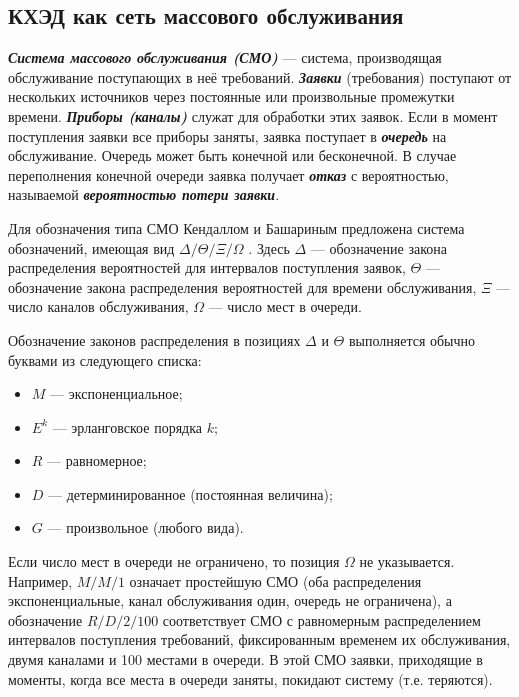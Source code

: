 \subsection{КХЭД как сеть массового обслуживания} \label{net}

\textbf{\textit{Система массового обслуживания (СМО)}} --- система, производящая обслуживание поступающих в неё требований. \textbf{\textit{Заявки}} (требования) поступают от нескольких источников через постоянные или произвольные промежутки времени. \textbf{\textit{Приборы (каналы)}} служат для обработки этих заявок. Если в момент поступления заявки все приборы заняты, заявка поступает в \textbf{\textit{очередь}} на обслуживание. Очередь может быть конечной или бесконечной. В случае переполнения конечной очереди заявка получает \textbf{\textit{отказ}} с вероятностью, называемой \textbf{\textit{вероятностью потери заявки}}.

\vspace{\baselineskip}
Для обозначения типа СМО Кендаллом и Башариным предложена система обозначений, имеющая вид $\Delta / \Theta / \Xi / \Omega$ \cite{basharinq,basharin-models,basharin-sb}. Здесь $\Delta$ --- обозначение закона распределения вероятностей для интервалов поступления заявок, $\Theta$ --- обозначение закона распределения вероятностей для времени обслуживания, $\Xi$ --- число каналов обслуживания, $\Omega$ --- число мест в очереди.

\vspace{\baselineskip}
Обозначение законов распределения в позициях $\Delta$ и $\Theta$ выполняется обычно буквами из следующего списка:

\begin{itemize}
  \item $M$ --- экспоненциальное;
  \item $E^k$ --- эрланговское порядка $k$;
  \item $R$ --- равномерное;
  \item $D$ --- детерминированное (постоянная величина);
  \item $G$ --- произвольное (любого вида).
\end{itemize}

Если число мест в очереди не ограничено, то позиция $\Omega$ не указывается.
Например, $M/M/1$ означает простейшую СМО (оба распределения экспоненциальные, канал обслуживания один, очередь не ограничена), а обозначение $R/D/2/100$ соответствует СМО с равномерным распределением интервалов поступления требований, фиксированным временем их обслуживания, двумя каналами и 100 местами в очереди. В этой СМО заявки, приходящие в моменты, когда все места в очереди заняты, покидают систему (т.е. теряются).

